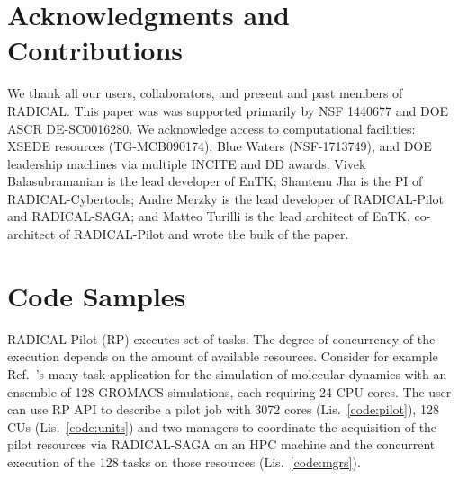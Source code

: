 \documentclass[preprint,12pt, a4paper]{elsarticle}
\begin{document}
\section*{Acknowledgments and Contributions}

We thank all our users, collaborators, and present and past members of
RADICAL\@. This paper was was supported primarily by NSF 1440677 and DOE ASCR
{DE-SC0016280}. We acknowledge access to computational facilities: XSEDE
resources (TG-MCB090174), Blue Waters (NSF-1713749), and DOE leadership
machines via multiple INCITE and DD awards. Vivek Balasubramanian is the lead
developer of EnTK\@; Shantenu Jha is the PI of RADICAL-Cybertools; Andre
Merzky is the lead developer of RADICAL-Pilot and RADICAL-SAGA\@; and Matteo
Turilli is the lead architect of EnTK, co-architect of
RADICAL-Pilot and wrote the bulk of the paper.

 



\appendix


\section*{Code Samples}\label{sec:metadata}

RADICAL-Pilot (RP) executes set of tasks. The degree of concurrency of the
execution depends on the amount of available resources. Consider for example
Ref.~\cite{balasubramanian2016extasy}'s many-task application for the
simulation of molecular dynamics with an ensemble of 128 GROMACS simulations,
each requiring 24 CPU cores. The user can use RP API to describe a pilot job
with 3072 cores (Lis.~\ref{code:pilot}), 128 CUs (Lis.~\ref{code:units}) and
two managers to coordinate the acquisition of the pilot resources via
RADICAL-SAGA on an HPC machine and the concurrent execution of the 128 tasks
on those resources (Lis.~\ref{code:mgrs}).
\end{document}
